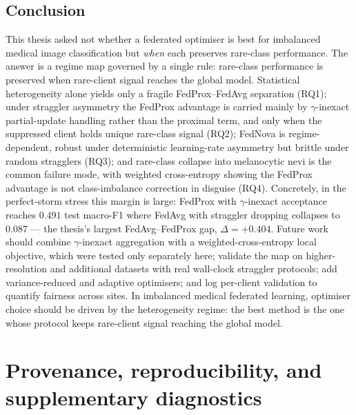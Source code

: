 \documentclass[11pt,a4paper]{report}
\begin{document}
\section{Conclusion}
\label{sec:conc}

This thesis asked not whether a federated optimiser is best for imbalanced medical
image classification but \emph{when} each preserves rare-class performance. The
answer is a regime map governed by a single rule: rare-class performance is
preserved when rare-client signal reaches the global model. Statistical
heterogeneity alone yields only a fragile FedProx--FedAvg separation (RQ1); under
straggler asymmetry the FedProx advantage is carried mainly by $\gamma$-inexact
partial-update handling rather than the proximal term, and only when the
suppressed client holds unique rare-class signal (RQ2); FedNova is
regime-dependent, robust under deterministic learning-rate asymmetry but brittle
under random stragglers (RQ3); and rare-class collapse into melanocytic nevi is
the common failure mode, with weighted cross-entropy showing the FedProx advantage
is not class-imbalance correction in disguise (RQ4). Concretely, in the
perfect-storm stress this margin is large: FedProx with $\gamma$-inexact
acceptance reaches $0.491$ test macro-F1 where FedAvg with straggler dropping
collapses to $0.087$ --- the thesis's largest FedAvg--FedProx gap, $\Delta =
+0.404$. Future work should combine
$\gamma$-inexact aggregation with a weighted-cross-entropy local objective, which
were tested only separately here; validate the map on higher-resolution and
additional datasets with real wall-clock straggler protocols; add variance-reduced
and adaptive optimisers; and log per-client validation to quantify fairness across
sites. In imbalanced medical federated learning, optimiser choice should be driven by the
heterogeneity regime: the best method is the one whose protocol keeps rare-client
signal reaching the global model.






\appendix

\chapter{Provenance, reproducibility, and supplementary diagnostics}
\label{app:repro}
\end{document}
